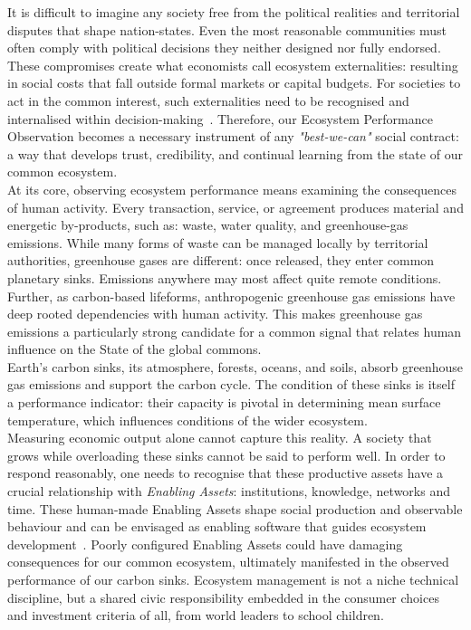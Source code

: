It is difficult to imagine any society free from the political realities and territorial disputes that shape nation-states.
Even the most reasonable communities must often comply with political decisions they neither designed nor fully endorsed.
These compromises create what economists call ecosystem externalities: resulting in social costs that fall outside formal markets or capital budgets.
For societies to act in the common interest, such externalities need to be recognised and internalised within decision-making~\cite{rc1}.
Therefore, our Ecosystem Performance Observation becomes a necessary instrument of any \emph{"best-we-can"} social contract: a way that develops trust, credibility, and continual learning from the state of our common ecosystem.\\

At its core, observing ecosystem performance means examining the consequences of human activity.
Every transaction, service, or agreement produces material and energetic by-products, such as: waste, water quality, and greenhouse-gas emissions.
While many forms of waste can be managed locally by territorial authorities, greenhouse gases are different: once released, they enter common planetary sinks.
Emissions anywhere may most affect quite remote conditions.
Further, as carbon-based lifeforms, anthropogenic greenhouse gas emissions have deep rooted dependencies with human activity.
This makes greenhouse gas emissions a particularly strong candidate for a common signal that relates human influence on the State of the global commons.\\

Earth’s carbon sinks, its atmosphere, forests, oceans, and soils, absorb greenhouse gas emissions and support the carbon cycle.
The condition of these sinks is itself a performance indicator: their capacity is pivotal in determining mean surface temperature, which influences conditions of the wider ecosystem.\\
Measuring economic output alone cannot capture this reality.
A society that grows while overloading these sinks cannot be said to perform well.
In order to respond reasonably, one needs to recognise that these productive assets have a crucial relationship with \emph{Enabling Assets}: institutions, knowledge, networks and time.
These human-made Enabling Assets shape social production and observable behaviour and can be envisaged as enabling software that guides ecosystem development~\cite{pd3}.
Poorly configured Enabling Assets could have damaging consequences for our common ecosystem, ultimately manifested in the observed performance of our carbon sinks.
Ecosystem management is not a niche technical discipline, but a shared civic responsibility embedded in the consumer choices and investment criteria of all, from world leaders to school children.\\

